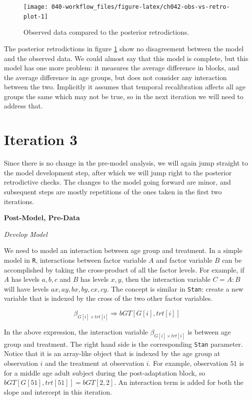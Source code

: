 \documentclass[11pt, oneside, openany]{scrbook}
\begin{document}
\begin{figure}

{\centering \texttt{[image: 040-workflow\_files/figure-latex/ch042-obs-vs-retro-plot-1]} 

}

\caption{Observed data compared to the posterior retrodictions.}\label{fig:ch042-obs-vs-retro-plot}
\end{figure}

The posterior retrodictions in figure \ref{fig:ch042-obs-vs-retro-plot} show no disagreement between the model and the observed data. We could almost say that this model is complete, but this model has one more problem: it measures the average difference in blocks, and the average difference in age groups, but does not consider any interaction between the two. Implicitly it assumes that temporal recalibration affects all age groups the same which may not be true, so in the next iteration we will need to address that.

\hypertarget{iter3}{%
\section{Iteration 3}\label{iter3}}

Since there is no change in the pre-model analysis, we will again jump straight to the model development step, after which we will jump right to the posterior retrodictive checks. The changes to the model going forward are minor, and subsequent steps are mostly repetitions of the ones taken in the first two iterations.

\textbf{Post-Model, Pre-Data}

\emph{Develop Model}

We need to model an interaction between age group and treatment. In a simple model in \texttt{R}, interactions between factor variable \(A\) and factor variable \(B\) can be accomplished by taking the cross-product of all the factor levels. For example, if \(A\) has levels \(a, b, c\) and \(B\) has levels \(x, y\), then the interaction variable \(C=A:B\) will have levels \(ax, ay, bx, by, cx, cy\). The concept is similar in \texttt{Stan}: create a new variable that is indexed by the cross of the two other factor variables.

\[
\beta_{G[i] \times trt[i]} \Longrightarrow bGT[G[i], trt[i]] 
\]

In the above expression, the interaction variable \(\beta_{G[i] \times trt[i]}\) is between age group and treatment. The right hand side is the corresponding \texttt{Stan} parameter. Notice that it is an array-like object that is indexed by the age group at observation \(i\) and the treatment at observation \(i\). For example, observation \(51\) is for a middle age adult subject during the post-adaptation block, so \(bGT[G[51], trt[51]] = bGT[2, 2]\). An interaction term is added for both the slope and intercept in this iteration.
\end{document}
